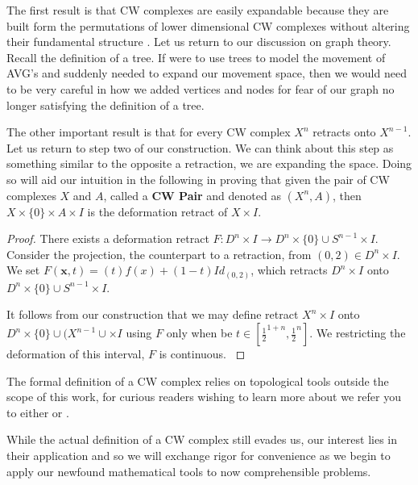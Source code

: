 \documentclass[12pt,oneside]{amsbook}
\begin{document}
The first result is that CW complexes are easily expandable because they are built form the permutations of lower dimensional CW complexes without altering their fundamental structure \cite{cw}. Let us return to our discussion on graph theory. Recall the definition of a tree. If were to use trees to model the movement of AVG's and suddenly needed to expand our movement space, then we would need to be very careful in how we added vertices and nodes for fear of our graph no longer satisfying the definition of a tree.

The other important result is that for every CW complex $X^n$ retracts onto $X^{n-1}$. Let us return to step two of our construction. We can think about this step as something similar to the opposite a retraction, we are expanding the space. Doing so will aid our intuition in the following in proving that given the pair of CW complexes $X$ and $A$, called a \textbf{CW Pair} and denoted as $(X^n, A)$, then $X\times \{0\} \times A\times I$ is the deformation retract of $X\times I$.

\begin{proof}
There exists a deformation retract $F\colon D^n \times I \rightarrow D^n \times \{0\} \cup S^{n-1} \times I$. Consider the projection, the counterpart to a retraction, from $(0,2)\in D^n \times I$. We set $F(\textbf{x}, t) = (t)f(x) + (1-t)Id_{(0,2)}$, which retracts $D^n \times I$ onto $D^n \times \{0\} \cup S^{n-1} \times I$. 

It follows from our construction that we may define retract $ X^n \times I $ onto $ D^n \times \{0\} \cup (X^{n-1} \cup  \times I$ using $F$ only when  be $t\in [\frac{1}{2}^{1+n}, \frac{1}{2}^{n}]$. We restricting the deformation of this interval, $F$ is continuous. \cite{at}
\end{proof}

The formal definition of a CW complex relies on topological tools outside the scope of this work, for curious readers wishing to learn more about we refer you to either \cite{at} or \cite{cw}.

While the actual definition of a CW complex still evades us, our interest lies in their application and so we will exchange rigor for convenience as we begin to apply our newfound mathematical tools to now comprehensible problems.
\end{document}
